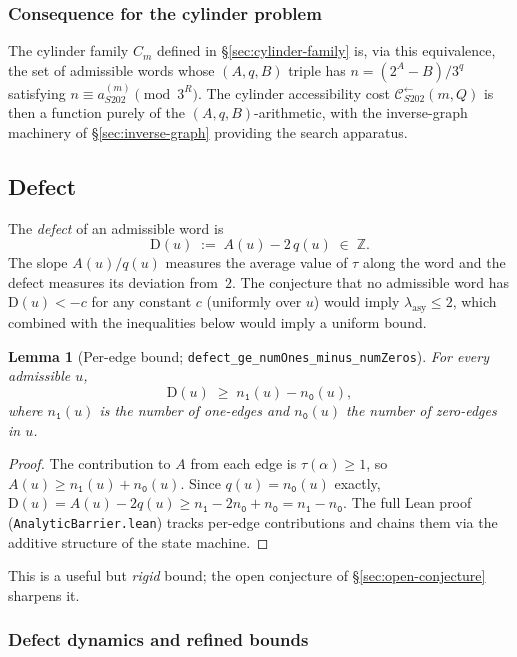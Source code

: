 \documentclass[11pt,a4paper]{article}
\theoremstyle{plain}
\newtheorem{lemma}[theorem]{Lemma}
\theoremstyle{definition}
\newcommand{\ZZ}{\mathbb{Z}}
\newcommand{\aSat}{a_{S202}^{(m)}}
\newcommand{\defect}{\mathrm{D}}
\newcommand{\Cback}{\mathcal{C}^{\!\leftarrow}_{S202}}
\newcommand{\numOnes}{n_{\mathtt{1}}}
\newcommand{\numZeros}{n_{\mathtt{0}}}
\begin{document}
\subsubsection*{Consequence for the cylinder problem}

The cylinder family $C_m$ defined in \S\ref{sec:cylinder-family}
is, via this equivalence, the set of admissible words whose
$(A, q, B)$ triple has $n = (2^A - B)/3^q$ satisfying
$n \equiv \aSat \pmod{3^{R}}$. The cylinder accessibility cost
$\Cback(m, Q)$ is then a function purely of the
$(A, q, B)$-arithmetic, with the inverse-graph machinery of
\S\ref{sec:inverse-graph} providing the search apparatus.

\subsection{Defect}

The \emph{defect} of an admissible word is
\[
  \defect(u) \;:=\; A(u) - 2 \, q(u) \;\in\; \ZZ.
\]
The slope $A(u)/q(u)$ measures the average value of $\tau$ along
the word and the defect measures its deviation from~$2$.
The conjecture that no admissible word has $\defect(u) < -c$ for any
constant $c$ (uniformly over $u$) would imply
$\lambda_{\mathrm{asy}} \le 2$, which combined with the
inequalities below would imply a uniform bound.

\begin{lemma}[Per-edge bound; \texttt{defect\_ge\_numOnes\_minus\_numZeros}]
\label{lem:per-edge-bound}
For every admissible $u$,
\[
  \defect(u) \;\ge\; \numOnes(u) - \numZeros(u),
\]
where $\numOnes(u)$ is the number of one-edges and
$\numZeros(u)$ the number of zero-edges in $u$.
\end{lemma}

\begin{proof}
The contribution to $A$ from each edge is $\tau(\alpha) \ge 1$, so
$A(u) \ge \numOnes(u) + \numZeros(u)$. Since $q(u) = \numZeros(u)$
exactly,
$\defect(u) = A(u) - 2 q(u) \ge \numOnes - 2 \numZeros + \numZeros
            = \numOnes - \numZeros$.
The full Lean proof
(\texttt{AnalyticBarrier.lean}) tracks per-edge contributions and
chains them via the additive structure of the state machine.
\end{proof}

This is a useful but \emph{rigid} bound; the open conjecture of
\S\ref{sec:open-conjecture} sharpens it.

\subsubsection*{Defect dynamics and refined bounds}
\end{document}
